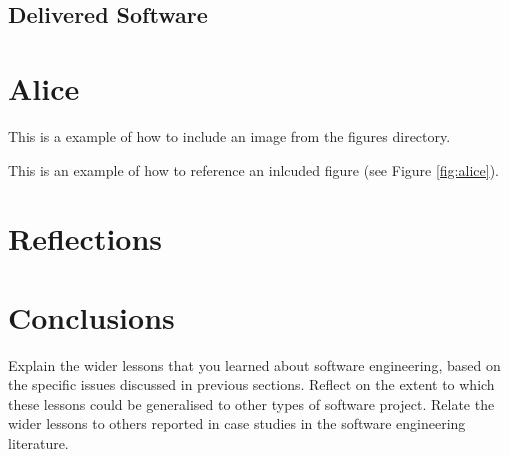 \documentclass{l3proj}
\begin{document}
\subsection{Delivered Software}
\label{finsoftware}

\newpage

\section{Alice}
\label{sec:alice}

This is a example of how to include an image from the figures directory.



This is an example of how to reference an inlcuded figure (see Figure \ref{fig:alice}).

\section{Reflections}
\label{sec:reflections}


\section{Conclusions}
\label{sec:conclusions}

Explain the wider lessons that you learned about software engineering,
based on the specific issues discussed in previous sections.  Reflect
on the extent to which these lessons could be generalised to other
types of software project.  Relate the wider lessons to others
reported in case studies in the software engineering literature.



\end{document}
